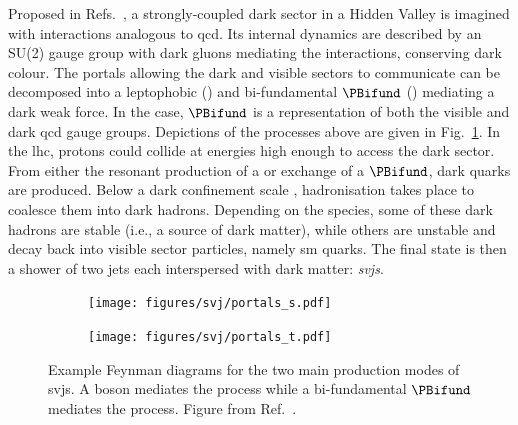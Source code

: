 Proposed in Refs.~, a strongly-coupled dark sector in a Hidden Valley is imagined with interactions analogous to \acrshort{qcd}. Its internal dynamics are described by an SU(2) gauge group with dark gluons mediating the interactions, conserving dark colour. The portals allowing the dark and visible sectors to communicate can be decomposed into a leptophobic \PZprime (\schannel) and bi-fundamental $\PBifund$ (\tchannel) mediating a dark weak force. In the \tchannel case, $\PBifund$ is a representation of both the visible and dark \acrshort{qcd} gauge groups. Depictions of the processes above are given in Fig.~\ref{fig:theory_svj_portals}. In the \acrshort{lhc}, protons could collide at energies high enough to access the dark sector. From either the resonant production of a \PZprime or exchange of a $\PBifund$, dark quarks \Pqdark are produced. Below a dark confinement scale \lamDark, hadronisation takes place to coalesce them into dark hadrons. Depending on the species, some of these dark hadrons are stable (i.e., a source of dark matter), while others are unstable and decay back into visible sector particles, namely \acrlong{sm} quarks. The final state is then a shower of two \glspl{jet} each interspersed with dark matter: \emph{\glspl{svj}}.

\begin{figure}[htbp]
    \centering
    \begin{subfigure}[c]{0.32\textwidth}
    \centering
        \texttt{[image: figures/svj/portals\_s.pdf]}
        \caption{\schannel}
    \end{subfigure}
    \hspace{0.1\textwidth}
    \begin{subfigure}[c]{0.32\textwidth}
    \centering
        \texttt{[image: figures/svj/portals\_t.pdf]}
        \caption{\tchannel}
    \end{subfigure}
\caption[Example Feynman diagrams for the two main production modes of semi-visible jets. A \PZprime boson mediates the \schannel process while a bi-fundamental $\PBifund$ mediates the \tchannel process]{Example Feynman diagrams for the two main production modes of \glspl{svj}. A \PZprime boson mediates the \schannel process while a bi-fundamental $\PBifund$ mediates the \tchannel process. Figure from Ref.~.}
\label{fig:theory_svj_portals}
\end{figure}




